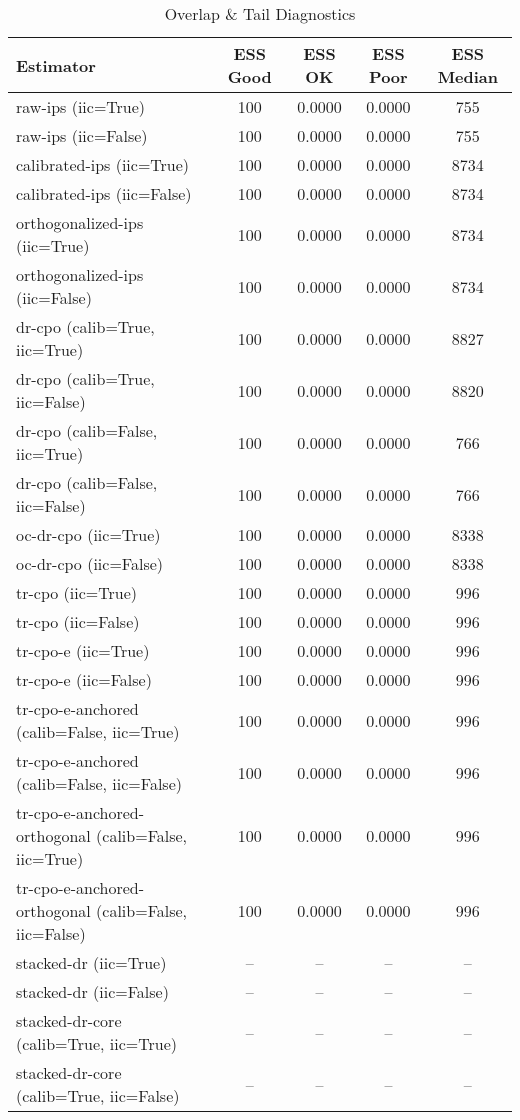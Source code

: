 \begin{table}[htbp]
\centering
\caption{Overlap & Tail Diagnostics}
\label{tab:A3}
\begin{tabular}{l|cccc}
\toprule
Estimator & ESS Good & ESS OK & ESS Poor & ESS Median \\
\midrule
raw-ips (iic=True) & 100 & 0.0000 & 0.0000 & 755 \\
raw-ips (iic=False) & 100 & 0.0000 & 0.0000 & 755 \\
calibrated-ips (iic=True) & 100 & 0.0000 & 0.0000 & 8734 \\
calibrated-ips (iic=False) & 100 & 0.0000 & 0.0000 & 8734 \\
orthogonalized-ips (iic=True) & 100 & 0.0000 & 0.0000 & 8734 \\
orthogonalized-ips (iic=False) & 100 & 0.0000 & 0.0000 & 8734 \\
dr-cpo (calib=True, iic=True) & 100 & 0.0000 & 0.0000 & 8827 \\
dr-cpo (calib=True, iic=False) & 100 & 0.0000 & 0.0000 & 8820 \\
dr-cpo (calib=False, iic=True) & 100 & 0.0000 & 0.0000 & 766 \\
dr-cpo (calib=False, iic=False) & 100 & 0.0000 & 0.0000 & 766 \\
oc-dr-cpo (iic=True) & 100 & 0.0000 & 0.0000 & 8338 \\
oc-dr-cpo (iic=False) & 100 & 0.0000 & 0.0000 & 8338 \\
tr-cpo (iic=True) & 100 & 0.0000 & 0.0000 & 996 \\
tr-cpo (iic=False) & 100 & 0.0000 & 0.0000 & 996 \\
tr-cpo-e (iic=True) & 100 & 0.0000 & 0.0000 & 996 \\
tr-cpo-e (iic=False) & 100 & 0.0000 & 0.0000 & 996 \\
tr-cpo-e-anchored (calib=False, iic=True) & 100 & 0.0000 & 0.0000 & 996 \\
tr-cpo-e-anchored (calib=False, iic=False) & 100 & 0.0000 & 0.0000 & 996 \\
tr-cpo-e-anchored-orthogonal (calib=False, iic=True) & 100 & 0.0000 & 0.0000 & 996 \\
tr-cpo-e-anchored-orthogonal (calib=False, iic=False) & 100 & 0.0000 & 0.0000 & 996 \\
stacked-dr (iic=True) & -- & -- & -- & -- \\
stacked-dr (iic=False) & -- & -- & -- & -- \\
stacked-dr-core (calib=True, iic=True) & -- & -- & -- & -- \\
stacked-dr-core (calib=True, iic=False) & -- & -- & -- & -- \\
\bottomrule
\end{tabular}
\end{table}